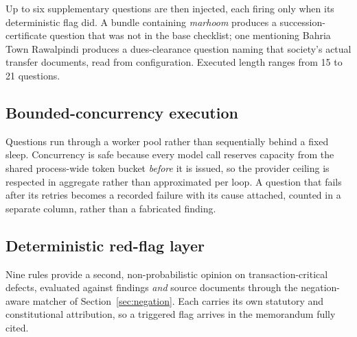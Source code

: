 \documentclass[11pt,a4paper]{article}
\begin{document}
Up to six supplementary questions are then injected, each firing only when its deterministic
flag did. A bundle containing \emph{marhoom} produces a succession-certificate question that
was not in the base checklist; one mentioning Bahria Town Rawalpindi produces a
dues-clearance question naming that society's actual transfer documents, read from
configuration. Executed length ranges from 15 to 21 questions.

\subsection{Bounded-concurrency execution}

Questions run through a worker pool rather than sequentially behind a fixed sleep.
Concurrency is safe because every model call reserves capacity from the shared
process-wide token bucket \emph{before} it is issued, so the provider ceiling is respected
in aggregate rather than approximated per loop. A question that fails after its retries
becomes a recorded failure with its cause attached, counted in a separate column, rather
than a fabricated finding.

\subsection{Deterministic red-flag layer}

Nine rules provide a second, non-probabilistic opinion on transaction-critical defects,
evaluated against findings \emph{and} source documents through the negation-aware matcher
of Section~\ref{sec:negation}. Each carries its own statutory and constitutional
attribution, so a triggered flag arrives in the memorandum fully cited.
\end{document}
